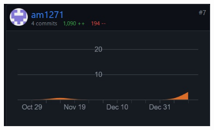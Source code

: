 		\begin{figure}[H]
			\includegraphics[width=\textwidth]{slike/antonija.JPG}
			\label{antonijaDiagram}
		\end{figure}

